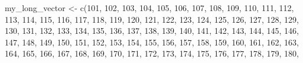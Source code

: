 \documentclass[
  letterpaper,
  DIV=11,
  numbers=noendperiod]{scrreprt}
\newenvironment{Shaded}{\begin{snugshade}}{\end{snugshade}}
\newcommand{\DecValTok}[1]{\textcolor[rgb]{0.68,0.00,0.00}{#1}}
\newcommand{\FunctionTok}[1]{\textcolor[rgb]{0.28,0.35,0.67}{#1}}
\newcommand{\NormalTok}[1]{\textcolor[rgb]{0.00,0.23,0.31}{#1}}
\newcommand{\OtherTok}[1]{\textcolor[rgb]{0.00,0.23,0.31}{#1}}
\begin{document}
\begin{Shaded}
\begin{Highlighting}[]
\NormalTok{my\_long\_vector }\OtherTok{\textless{}{-}} \FunctionTok{c}\NormalTok{(}\DecValTok{101}\NormalTok{, }\DecValTok{102}\NormalTok{, }\DecValTok{103}\NormalTok{, }\DecValTok{104}\NormalTok{, }\DecValTok{105}\NormalTok{, }\DecValTok{106}\NormalTok{, }\DecValTok{107}\NormalTok{, }\DecValTok{108}\NormalTok{, }\DecValTok{109}\NormalTok{, }\DecValTok{110}\NormalTok{, }
                    \DecValTok{111}\NormalTok{, }\DecValTok{112}\NormalTok{, }\DecValTok{113}\NormalTok{, }\DecValTok{114}\NormalTok{, }\DecValTok{115}\NormalTok{, }\DecValTok{116}\NormalTok{, }\DecValTok{117}\NormalTok{, }\DecValTok{118}\NormalTok{, }\DecValTok{119}\NormalTok{, }\DecValTok{120}\NormalTok{, }
                    \DecValTok{121}\NormalTok{, }\DecValTok{122}\NormalTok{, }\DecValTok{123}\NormalTok{, }\DecValTok{124}\NormalTok{, }\DecValTok{125}\NormalTok{, }\DecValTok{126}\NormalTok{, }\DecValTok{127}\NormalTok{, }\DecValTok{128}\NormalTok{, }\DecValTok{129}\NormalTok{, }\DecValTok{130}\NormalTok{, }
                    \DecValTok{131}\NormalTok{, }\DecValTok{132}\NormalTok{, }\DecValTok{133}\NormalTok{, }\DecValTok{134}\NormalTok{, }\DecValTok{135}\NormalTok{, }\DecValTok{136}\NormalTok{, }\DecValTok{137}\NormalTok{, }\DecValTok{138}\NormalTok{, }\DecValTok{139}\NormalTok{, }\DecValTok{140}\NormalTok{, }
                    \DecValTok{141}\NormalTok{, }\DecValTok{142}\NormalTok{, }\DecValTok{143}\NormalTok{, }\DecValTok{144}\NormalTok{, }\DecValTok{145}\NormalTok{, }\DecValTok{146}\NormalTok{, }\DecValTok{147}\NormalTok{, }\DecValTok{148}\NormalTok{, }\DecValTok{149}\NormalTok{, }\DecValTok{150}\NormalTok{, }
                    \DecValTok{151}\NormalTok{, }\DecValTok{152}\NormalTok{, }\DecValTok{153}\NormalTok{, }\DecValTok{154}\NormalTok{, }\DecValTok{155}\NormalTok{, }\DecValTok{156}\NormalTok{, }\DecValTok{157}\NormalTok{, }\DecValTok{158}\NormalTok{, }\DecValTok{159}\NormalTok{, }\DecValTok{160}\NormalTok{, }
                    \DecValTok{161}\NormalTok{, }\DecValTok{162}\NormalTok{, }\DecValTok{163}\NormalTok{, }\DecValTok{164}\NormalTok{, }\DecValTok{165}\NormalTok{, }\DecValTok{166}\NormalTok{, }\DecValTok{167}\NormalTok{, }\DecValTok{168}\NormalTok{, }\DecValTok{169}\NormalTok{, }\DecValTok{170}\NormalTok{, }
                    \DecValTok{171}\NormalTok{, }\DecValTok{172}\NormalTok{, }\DecValTok{173}\NormalTok{, }\DecValTok{174}\NormalTok{, }\DecValTok{175}\NormalTok{, }\DecValTok{176}\NormalTok{, }\DecValTok{177}\NormalTok{, }\DecValTok{178}\NormalTok{, }\DecValTok{179}\NormalTok{, }\DecValTok{180}\NormalTok{, }

\end{Highlighting}
\end{Shaded}
\end{document}
